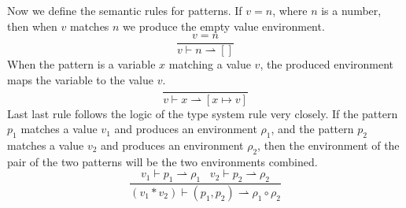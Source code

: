 Now we define the semantic rules for patterns. If $v=n$, where $n$ is a number, then when $v$ matches $n$ we produce the empty value environment.
$$\frac{v=n}{v\vdash n \rightharpoonup []}$$
When the pattern is a variable $x$ matching a value $v$, the produced environment maps the variable to the value $v$.
$$\frac{}{v \vdash x \rightharpoonup [x \mapsto v]}$$
Last last rule follows the logic of the type system rule very closely. If the pattern $p_1$ matches a value $v_1$ and produces an environment $\rho_1$, and the pattern $p_2$ matches a value $v_2$ and produces an environment $\rho_2$, then the environment of the pair of the two patterns will be the two environments combined.
$$\frac{v_1 \vdash p_1 \rightharpoonup \rho_1 \;\;\; v_2 \vdash p_2 \rightharpoonup \rho_2}{(v_1*v_2)\vdash (p_1,p_2) \rightharpoonup \rho_1 \circ \rho_2}$$

